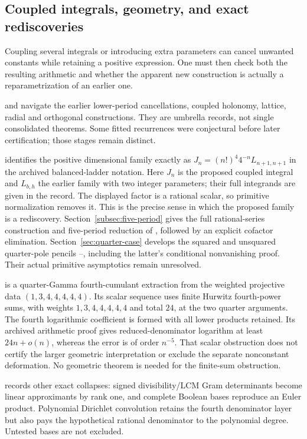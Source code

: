 \subsection{Coupled integrals, geometry, and exact rediscoveries}
Coupling several integrals or introducing extra parameters can cancel
unwanted constants while retaining a positive expression. One must then
check both the resulting arithmetic and whether the apparent new
construction is actually a reparametrization of an earlier one.

 and  navigate the earlier lower-period cancellations, coupled
holonomy, lattice, radial and orthogonal constructions. They are umbrella
records, not single consolidated theorems. Some fitted recurrences were
conjectural before later certification; those stages remain distinct.

 identifies the positive dimensional family exactly as
$J_n=(n!)^4 4^{-n}L_{n+1,n+1}$ in the archived balanced-ladder
notation. Here $J_n$ is the proposed coupled integral and $L_{b,h}$
the earlier family with two integer parameters; their full integrands
are given in the record. The displayed factor is a rational scalar,
so primitive normalization removes it. This is the precise sense in
which the proposed family is a rediscovery. Section~\ref{subsec:five-period} gives the full rational-series
construction and five-period reduction of , followed by
an explicit cofactor elimination. Section~\ref{sec:quarter-case} develops
the squared and unsquared quarter-pole pencils --,
including the latter's conditional nonvanishing proof. Their actual
primitive asymptotics remain unresolved.

 is a quarter-Gamma fourth-cumulant extraction from the weighted
projective data $(1,3,4,4,4,4,4)$. Its scalar sequence uses finite
Hurwitz fourth-power sums, with weights $1,3,4,4,4,4,4$ and total $24$,
at the two quarter arguments. The fourth logarithmic coefficient is
formed with all lower products retained. Its archived arithmetic proof
gives reduced-denominator logarithm at least $24n+o(n)$, whereas
the error is of order $n^{-5}$. That scalar obstruction does not certify
the larger geometric interpretation or exclude the separate nonconstant
deformation. No geometric theorem is needed for the finite-sum obstruction.

 records other exact collapses: signed divisibility/LCM Gram
determinants become linear approximants by rank one, and complete Boolean
bases reproduce an Euler product. Polynomial Dirichlet convolution retains
the fourth denominator layer but also pays the hypothetical rational
denominator to the polynomial degree. Untested bases are not excluded.

